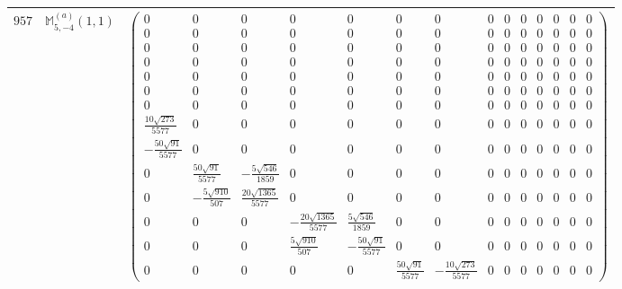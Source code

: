 \documentclass[fleqn,8pt,landscape]{jsarticle}
\begin{document}
\begin{center}
\begin{longtable}{ccc}
$ 957 $ & $ \mathbb{M}_{5,-4}^{(a)}(1,1) $ & $ \begin{pmatrix} 0 & 0 & 0 & 0 & 0 & 0 & 0 & 0 & 0 & 0 & 0 & 0 & 0 & 0 \\ 0 & 0 & 0 & 0 & 0 & 0 & 0 & 0 & 0 & 0 & 0 & 0 & 0 & 0 \\ 0 & 0 & 0 & 0 & 0 & 0 & 0 & 0 & 0 & 0 & 0 & 0 & 0 & 0 \\ 0 & 0 & 0 & 0 & 0 & 0 & 0 & 0 & 0 & 0 & 0 & 0 & 0 & 0 \\ 0 & 0 & 0 & 0 & 0 & 0 & 0 & 0 & 0 & 0 & 0 & 0 & 0 & 0 \\ 0 & 0 & 0 & 0 & 0 & 0 & 0 & 0 & 0 & 0 & 0 & 0 & 0 & 0 \\ 0 & 0 & 0 & 0 & 0 & 0 & 0 & 0 & 0 & 0 & 0 & 0 & 0 & 0 \\ \frac{10 \sqrt{273}}{5577} & 0 & 0 & 0 & 0 & 0 & 0 & 0 & 0 & 0 & 0 & 0 & 0 & 0 \\ - \frac{50 \sqrt{91}}{5577} & 0 & 0 & 0 & 0 & 0 & 0 & 0 & 0 & 0 & 0 & 0 & 0 & 0 \\ 0 & \frac{50 \sqrt{91}}{5577} & - \frac{5 \sqrt{546}}{1859} & 0 & 0 & 0 & 0 & 0 & 0 & 0 & 0 & 0 & 0 & 0 \\ 0 & - \frac{5 \sqrt{910}}{507} & \frac{20 \sqrt{1365}}{5577} & 0 & 0 & 0 & 0 & 0 & 0 & 0 & 0 & 0 & 0 & 0 \\ 0 & 0 & 0 & - \frac{20 \sqrt{1365}}{5577} & \frac{5 \sqrt{546}}{1859} & 0 & 0 & 0 & 0 & 0 & 0 & 0 & 0 & 0 \\ 0 & 0 & 0 & \frac{5 \sqrt{910}}{507} & - \frac{50 \sqrt{91}}{5577} & 0 & 0 & 0 & 0 & 0 & 0 & 0 & 0 & 0 \\ 0 & 0 & 0 & 0 & 0 & \frac{50 \sqrt{91}}{5577} & - \frac{10 \sqrt{273}}{5577} & 0 & 0 & 0 & 0 & 0 & 0 & 0 \end{pmatrix} $ \\ \hline

\end{longtable}
\end{center}
\end{document}
